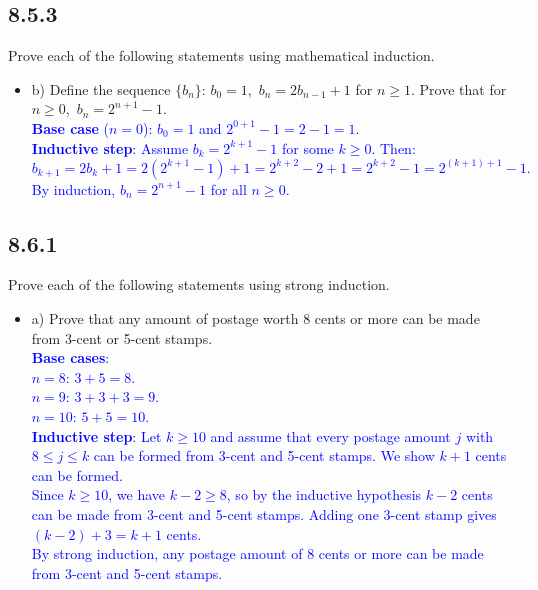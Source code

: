 \documentclass{article}
\begin{document}
\subsection*{8.5.3}
Prove each of the following statements using mathematical induction.
\begin{itemize}
    \item b) Define the sequence $\{b_n\}$: $b_0 = 1$,\ $b_n = 2b_{n-1} + 1$ for $n \ge 1$. Prove that for $n \ge 0$,\ $b_n = 2^{n+1} - 1$. \\
    \textcolor{blue}{
    \textbf{Base case} ($n = 0$): $b_0 = 1$ and $2^{0+1} - 1 = 2 - 1 = 1$. \\[4pt]
    \textbf{Inductive step}: Assume $b_k = 2^{k+1} - 1$ for some $k \ge 0$. Then:
    \[
        b_{k+1} = 2b_k + 1 = 2(2^{k+1} - 1) + 1 = 2^{k+2} - 2 + 1 = 2^{k+2} - 1 = 2^{(k+1)+1} - 1.
    \]
    By induction, $b_n = 2^{n+1} - 1$ for all $n \ge 0$.
    }
\end{itemize}

\subsection*{8.6.1}
Prove each of the following statements using strong induction.
\begin{itemize}
    \item a) Prove that any amount of postage worth 8 cents or more can be made from 3-cent or 5-cent stamps. \\
    \textcolor{blue}{
    \textbf{Base cases}:\\
    $n = 8$: $3 + 5 = 8$. \\
    $n = 9$: $3 + 3 + 3 = 9$. \\
    $n = 10$: $5 + 5 = 10$. \\[4pt]
    \textbf{Inductive step}: Let $k \ge 10$ and assume that every postage amount $j$ with $8 \le j \le k$ can be formed from 3-cent and 5-cent stamps. We show $k + 1$ cents can be formed.\\[4pt]
    Since $k \ge 10$, we have $k - 2 \ge 8$, so by the inductive hypothesis $k - 2$ cents can be made from 3-cent and 5-cent stamps. Adding one 3-cent stamp gives $(k-2) + 3 = k + 1$ cents. \\[4pt]
    By strong induction, any postage amount of 8 cents or more can be made from 3-cent and 5-cent stamps.
    }
\end{itemize}
\end{document}
